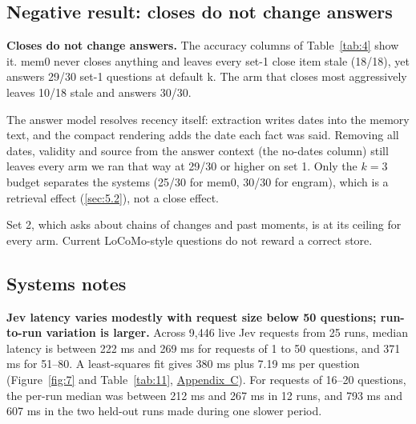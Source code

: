 \documentclass[11pt]{article}
\newcommand{\src}[1]{}
\begin{document}
\subsection{Negative result: closes do not change answers}\label{sec:5.4}
\textbf{Closes do not change answers.} The accuracy columns of Table~\ref{tab:4} show it. mem0 never closes anything and leaves every set-1 close item stale (18/18\src{bench/results/mem0\_\_dev\_updates.json}), yet answers 29/30\src{bench/results/mem0\_\_dev\_updates.json} set-1 questions at default k. The arm that closes most aggressively leaves 10/18\src{bench/results/e2\_jev\_v2\_\_dev\_updates\_\_k3.json} stale and answers 30/30\src{bench/results/e2\_jev\_v2\_\_dev\_updates\_\_k3.json}.

The answer model resolves recency itself: extraction writes dates into the memory text, and the compact rendering adds the date each fact was said. Removing all dates, validity and source from the answer context (the no-dates column) still leaves every arm we ran that way at 29/30\src{bench/results/mem0\_\_dev\_updates\_\_nodates.json} or higher on set 1. Only the $k{=}$3 budget separates the systems (25/30\src{bench/results/mem0\_\_dev\_updates\_\_k3.json} for mem0, 30/30\src{bench/results/e2\_jev\_v2\_\_dev\_updates\_\_k3.json} for engram), which is a retrieval effect (\cref{sec:5.2}), not a close effect.

Set 2, which asks about chains of changes and past moments, is at its ceiling for every arm. Current LoCoMo-style questions do not reward a correct store.

\subsection{Systems notes}\label{sec:5.5}
\textbf{Jev latency varies modestly with request size below 50 questions; run-to-run variation is larger.} Across 9,446\src{bench/results/jev\_latency.json} live Jev requests from 25\src{bench/results/jev\_latency.json} runs, median latency is between 222 ms\src{bench/results/jev\_latency.json} and 269 ms\src{bench/results/jev\_latency.json} for requests of 1 to 50 questions, and 371 ms\src{bench/results/jev\_latency.json} for 51--80. A least-squares fit gives 380 ms\src{bench/results/jev\_latency.json} plus 7.19\src{bench/results/jev\_latency.json} ms per question (Figure~\ref{fig:7} and Table~\ref{tab:11}, \hyperref[app:C]{Appendix~C}). For requests of 16--20 questions, the per-run median was between 212 ms\src{bench/results/jev\_latency.json: per-run median, 16–20-question requests, runs with ≥30 such requests} and 267 ms\src{bench/results/jev\_latency.json: per-run median, 16–20-question requests, runs with ≥30 such requests} in 12\src{bench/results/jev\_latency.json: runs with ≥30 16–20-question requests, excluding conv-30 and conv-41} runs, and 793 ms\src{bench/results/jev\_latency.json: per-run median, 16–20-question requests} and 607 ms\src{bench/results/jev\_latency.json: per-run median, 16–20-question requests} in the two held-out runs made during one slower period.
\end{document}
